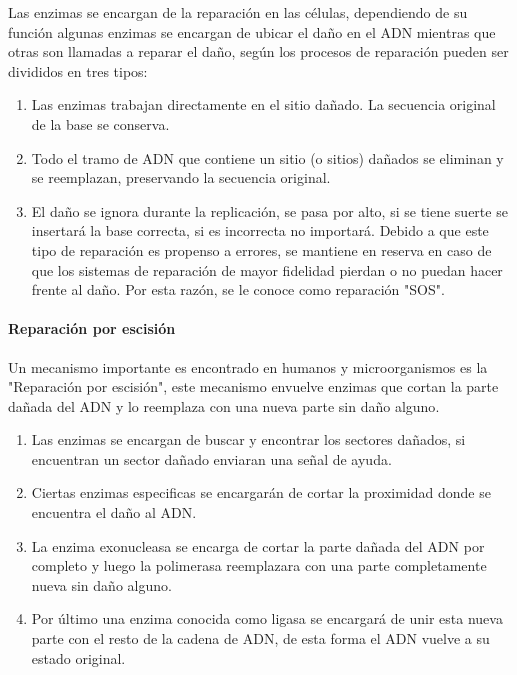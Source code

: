 Las enzimas se encargan de la reparación en las células, dependiendo de su función algunas enzimas se encargan de ubicar el daño en el ADN mientras que otras son llamadas a reparar el daño, según \cite{Thormod} los procesos de reparación pueden ser divididos en tres tipos:
\begin{enumerate}
\item Las enzimas trabajan directamente en el sitio dañado. La secuencia original de la base se conserva.
\item Todo el tramo de ADN que contiene un sitio (o sitios) dañados se eliminan y se reemplazan, preservando la secuencia original.
\item El daño se ignora durante la replicación, se pasa por alto, si se tiene suerte se insertará la base correcta, si es incorrecta no importará. Debido a que este tipo de reparación es propenso a errores, se mantiene en reserva en caso de que los sistemas de reparación de mayor fidelidad pierdan o no puedan hacer frente al daño. Por esta razón, se le conoce como reparación "SOS".
\end{enumerate}


\paragraph{Reparación por escisión}
Un mecanismo importante es encontrado en humanos y microorganismos es la "Reparación por escisión", este mecanismo envuelve enzimas que cortan la parte dañada del ADN y lo reemplaza con una nueva parte sin daño alguno\cite{Thormod}.
\begin{enumerate}
  \item Las enzimas se encargan de buscar y encontrar los sectores dañados, si encuentran un sector dañado enviaran una señal de ayuda.

  \item Ciertas enzimas especificas se encargarán de cortar la proximidad donde se encuentra el daño al ADN.

  \item La enzima exonucleasa se encarga de cortar la parte dañada del ADN por completo y luego la polimerasa reemplazara con una parte completamente nueva sin daño alguno.

  \item Por último una enzima conocida como ligasa se encargará de unir esta nueva parte con el resto de la cadena de ADN, de esta forma el ADN vuelve a su estado original.
\end{enumerate}


